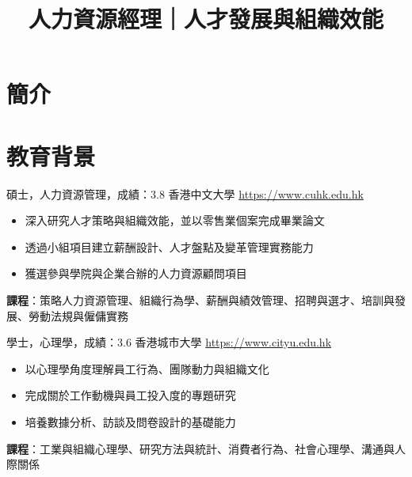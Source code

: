 \documentclass[a4paper, serif, 10pt]{moderncv}
\title{人力資源經理｜人才發展與組織效能}
\begin{document}
\maketitle

\section{簡介}

\section{教育背景}

        {碩士，人力資源管理，成績：3.8}
        {香港中文大學}
        {\url{https://www.cuhk.edu.hk}}
        {}
        {\begin{itemize}
\item 深入研究人才策略與組織效能，並以零售業個案完成畢業論文
\item 透過小組項目建立薪酬設計、人才盤點及變革管理實務能力
\item 獲選參與學院與企業合辦的人力資源顧問項目
\end{itemize}
\textbf{課程}：策略人力資源管理、組織行為學、薪酬與績效管理、招聘與選才、培訓與發展、勞動法規與僱傭實務}

        {學士，心理學，成績：3.6}
        {香港城市大學}
        {\url{https://www.cityu.edu.hk}}
        {}
        {\begin{itemize}
\item 以心理學角度理解員工行為、團隊動力與組織文化
\item 完成關於工作動機與員工投入度的專題研究
\item 培養數據分析、訪談及問卷設計的基礎能力
\end{itemize}
\textbf{課程}：工業與組織心理學、研究方法與統計、消費者行為、社會心理學、溝通與人際關係}
\end{document}
